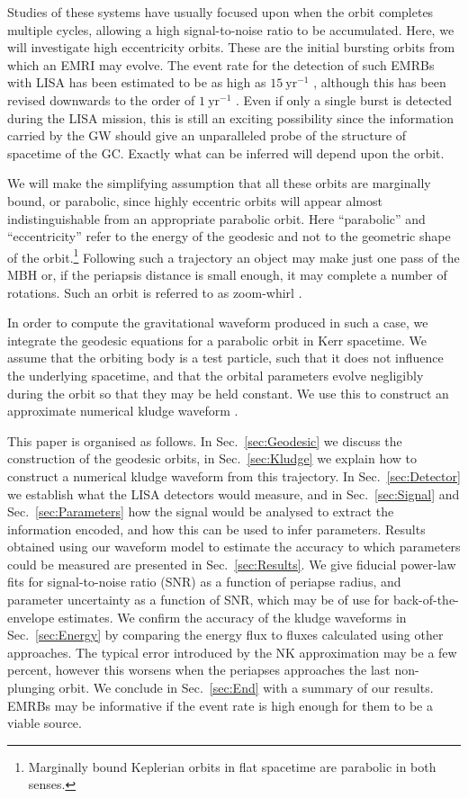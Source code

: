 \documentclass[useAMS,usedcolumn,usegraphicx,usenatbib]{mn2e}
\newcommand{\secref}[1]{Sec.~\ref{sec:#1}}
\newcommand{\units}[1]{\ensuremath{~\mathrm{#1}}}
\begin{document}
Studies of these systems have usually focused upon when the orbit completes multiple cycles, allowing a high signal-to-noise ratio to be accumulated. Here, we will investigate high eccentricity orbits. These are the initial bursting orbits from which an EMRI may evolve. The event rate for the detection of such EMRBs with LISA has been estimated to be as high as $15\units{yr^{-1}}$ \citep*{Rubbo2006}, although this has been revised downwards to the order of $1\units{yr^{-1}}$ \citep*{Hopman2007}. Even if only a single burst is detected during the LISA mission, this is still an exciting possibility since the information carried by the GW should give an unparalleled probe of the structure of spacetime of the GC. Exactly what can be inferred will depend upon the orbit.

We will make the simplifying assumption that all these orbits are marginally bound, or parabolic, since highly eccentric orbits will appear almost indistinguishable from an appropriate parabolic orbit. Here ``parabolic'' and ``eccentricity'' refer to the energy of the geodesic and not to the geometric shape of the orbit.\footnote{Marginally bound Keplerian orbits in flat spacetime are parabolic in both senses.} Following such a trajectory an object may make just one pass of the MBH or, if the periapsis distance is small enough, it may complete a number of rotations. Such an orbit is referred to as zoom-whirl \citep{Glampedakis2002a}.

In order to compute the gravitational waveform produced in such a case, we integrate the geodesic equations for a parabolic orbit in Kerr spacetime. We assume that the orbiting body is a test particle, such that it does not influence the underlying spacetime, and that the orbital parameters evolve negligibly during the orbit so that they may be held constant. We use this to construct an approximate numerical kludge waveform \citep{Babak2007}.

This paper is organised as follows. In \secref{Geodesic} we discuss the construction of the geodesic orbits, in \secref{Kludge} we explain how to construct a numerical kludge waveform from this trajectory. In \secref{Detector} we establish what the LISA detectors would measure, and in \secref{Signal} and \secref{Parameters} how the signal would be analysed to extract the information encoded, and how this can be used to infer parameters. Results obtained using our waveform model to estimate the accuracy to which parameters could be measured are presented in \secref{Results}. We give fiducial power-law fits for signal-to-noise ratio (SNR) as a function of periapse radius, and parameter uncertainty as a function of SNR, which may be of use for back-of-the-envelope estimates. We confirm the accuracy of the kludge waveforms in \secref{Energy} by comparing the energy flux to fluxes calculated using other approaches. The typical error introduced by the NK approximation may be a few percent, however this worsens when the periapses approaches the last non-plunging orbit. We conclude in \secref{End} with a summary of our results. EMRBs may be informative if the event rate is high enough for them to be a viable source.
\end{document}
